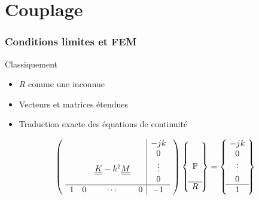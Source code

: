 \documentclass[10pt, compress]{beamer}
\newcommand\GP{\mathbb{P}}
\begin{document}
\section{Couplage}

\begin{frame}
	\frametitle{Conditions limites et FEM}

	\begin{block}{Classiquement}
		\begin{itemize}
			\item $R$ comme une inconnue
			\item Vecteurs et matrices étendues
			\item Traduction exacte des équations de continuité
		\end{itemize}

		\pause

		\begin{equation*}
			\left(~
			\begin{array}{cccc|c}
				&&&&-jk\\
				&&&&0\\
				& & \uul{K} - k^2\uul{M} & &\vdots \\
				&&&&0\\\hline
					1 & 0 & \cdots & 0& -1 \\
			\end{array}
			~\right)
			\left\{~
			\begin{matrix}
				\\
				\\
				\GP\\
				\\\hline
				R
			\end{matrix}
			~\right\} = 
			\left\{~
			\begin{matrix}
				-jk\\
				0\\
				\vdots\\
				0\\\hline
				1
			\end{matrix}
			~\right\}
		\end{equation*}
	\end{block}
\end{frame}
\end{document}
